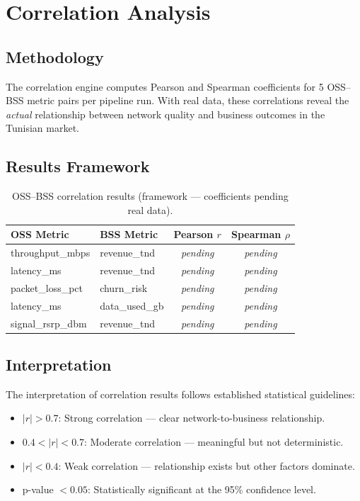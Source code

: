 \section{Correlation Analysis}
\label{sec:eval-correlation}

\subsection{Methodology}

The correlation engine computes Pearson and Spearman coefficients for 5 OSS--BSS metric pairs per pipeline run. With real data, these correlations reveal the \emph{actual} relationship between network quality and business outcomes in the Tunisian market.

\subsection{Results Framework}

\begin{table}[H]
\centering
\caption{OSS--BSS correlation results (framework --- coefficients pending real data).}
\label{tab:corr-results}
\begin{tabular}{@{}llcc@{}}
\toprule
\textbf{OSS Metric} & \textbf{BSS Metric} & \textbf{Pearson $r$} & \textbf{Spearman $\rho$} \\
\midrule
throughput\_mbps  & revenue\_tnd   & \textit{pending} & \textit{pending} \\
latency\_ms       & revenue\_tnd   & \textit{pending} & \textit{pending} \\
packet\_loss\_pct & churn\_risk    & \textit{pending} & \textit{pending} \\
latency\_ms       & data\_used\_gb & \textit{pending} & \textit{pending} \\
signal\_rsrp\_dbm & revenue\_tnd   & \textit{pending} & \textit{pending} \\
\bottomrule
\end{tabular}
\end{table}

\subsection{Interpretation}

The interpretation of correlation results follows established statistical guidelines:
\begin{itemize}
  \item $|r| > 0.7$: Strong correlation --- clear network-to-business relationship.
  \item $0.4 < |r| < 0.7$: Moderate correlation --- meaningful but not deterministic.
  \item $|r| < 0.4$: Weak correlation --- relationship exists but other factors dominate.
  \item p-value $< 0.05$: Statistically significant at the 95\% confidence level.
\end{itemize}


